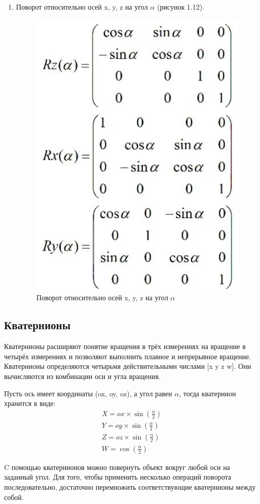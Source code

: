 \documentclass[12pt,a4paper,oneside]{report}
\begin{document}
\begin{enumerate}
		\item Поворот относительно осей x, y, z на угол $\alpha$ (рисунок 1.12).
		\begin{figure}[H]
			\centering
			\includegraphics[width = .5\linewidth]{rotation}
			\caption{Поворот относительно осей x, y, z на угол $\alpha$}
		\end{figure}
	
	\end{enumerate}

	\subsection{Кватернионы}
	 \quad Кватернионы расширяют понятие вращения в трёх измерениях на вращение в четырёх измерениях и позволяют выполнить плавное и непрерывное вращение. Кватернионы определяются четырьмя действительными числами [x y z w]. Они вычисляются из комбинации оси и угла вращения. 
	
	 Пусть ось имеет координаты  (ox, oy, oz), а угол равен $\alpha$, тогда кватернион хранится в виде:
	\begin{equation}
	\begin{gathered}
	X = ox \times \sin(\frac{\alpha}{2})\\
	Y = oy  \times \sin(\frac{\alpha}{2})\\
	Z = oz  \times  \sin(\frac{\alpha}{2})\\
	W = \cos(\frac{\alpha}{2})
	\end{gathered}
	\end{equation}
	
	 C помощью кватернионов можно повернуть объект вокруг любой оси на заданный угол. Для того, чтобы применить несколько операций поворота последовательно, достаточно перемножить соответствующие кватернионы между собой. 
	
\end{document}

